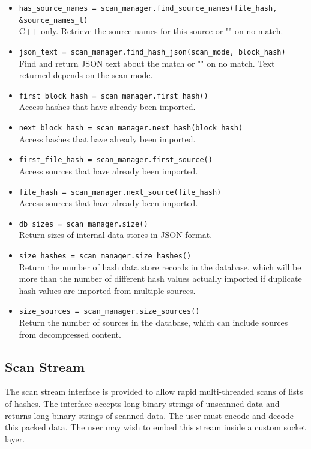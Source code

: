 \documentclass[11pt,fleqn]{article} %
\begin{document}
\begin{itemize}
\item \verb+has_source_names = scan_manager.find_source_names(file_hash,+\\
\verb+&source_names_t)+\\
C++ only. Retrieve the source names for this source or "" on no match.
\item \verb+json_text = scan_manager.find_hash_json(scan_mode, block_hash)+\\
Find and return JSON text about the match or "" on no match. Text returned depends on the scan mode.
\item \verb+first_block_hash = scan_manager.first_hash()+\\
Access hashes that have already been imported.
\item \verb+next_block_hash = scan_manager.next_hash(block_hash)+\\
Access hashes that have already been imported.
\item \verb+first_file_hash = scan_manager.first_source()+\\
Access sources that have already been imported.
\item \verb+file_hash = scan_manager.next_source(file_hash)+\\
Access sources that have already been imported.
\item \verb+db_sizes = scan_manager.size()+\\
Return sizes of internal data stores in JSON format.
\item \verb+size_hashes = scan_manager.size_hashes()+\\
Return the number of hash data store records in the database, which will be more than the number of different hash values actually imported if duplicate hash values are imported from multiple sources.
\item \verb+size_sources = scan_manager.size_sources()+\\
Return the number of sources in the database, which can include sources from decompressed content.
\end{itemize}

\subsection{Scan Stream}
The scan stream interface is provided to allow rapid multi-threaded scans of lists of hashes. The interface accepts long binary strings of unscanned data and returns long binary strings of scanned data. The user must encode and decode this packed data. The user may wish to embed this stream inside a custom socket layer.
\end{document}

